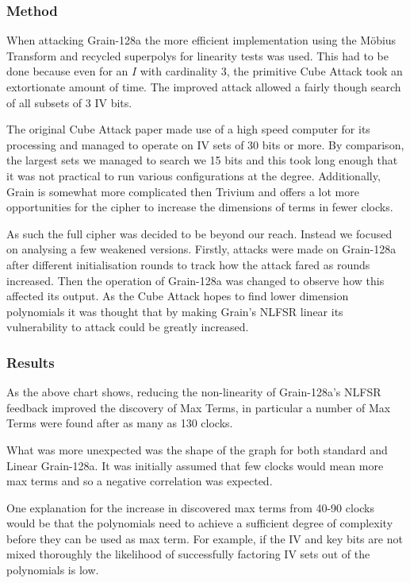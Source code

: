 \documentclass{report}
\let\Oldsubsubsection\subsubsection
\renewcommand{\subsubsection}{\FloatBarrier\Oldsubsubsection}
\begin{document}
\subsubsection{Method}
When attacking Grain-128a the more efficient implementation using the M\"{o}bius Transform and recycled superpolys for linearity tests was used. This had to be done because even for an $I$ with cardinality 3, the primitive Cube Attack took an extortionate amount of time. The improved attack allowed a fairly though search of all subsets of 3 IV bits.

The original Cube Attack paper made use of a high speed computer for its processing and managed to operate on IV sets of 30 bits or more. By comparison, the largest sets we managed to search we 15 bits and this took long enough that it was not practical to run various configurations at the degree. Additionally, Grain is somewhat more complicated then Trivium and offers a lot more opportunities for the cipher to increase the dimensions of terms in fewer clocks.

As such the full cipher was decided to be beyond our reach. Instead we focused on analysing a few weakened versions. Firstly, attacks were made on Grain-128a after different initialisation rounds to track how the attack fared as rounds increased. Then the operation of Grain-128a was changed to observe how this affected its output. As the Cube Attack hopes to find lower dimension polynomials it was thought that by making Grain's NLFSR linear its vulnerability to attack could be greatly increased.

\subsubsection{Results}
\begin{figure}[h]
\centering{
\resizebox{150mm}{!}{}
\label{fig:grain_chart}
}
\end{figure}
As the above chart shows, reducing the non-linearity of Grain-128a's NLFSR feedback improved the discovery of Max Terms, in particular a number of Max Terms were found after as many as 130 clocks.

What was more unexpected was the shape of the graph for both standard and Linear Grain-128a. It was initially assumed that few clocks would mean more max terms and so a negative correlation was expected.

One explanation for the increase in discovered max terms from 40-90 clocks would be that the polynomials need to achieve a sufficient degree of complexity before   they can be used as max term. For example, if the IV and key bits are not mixed thoroughly the likelihood of successfully factoring IV sets out of the polynomials is low.
\end{document}

